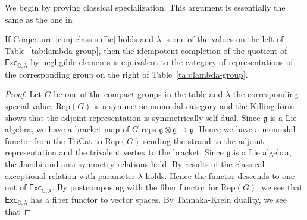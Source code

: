 \documentclass[12pt]{amsart}
\begin{document}
We begin by proving classical specialization.  This argument is essentially the same as the one in 

\begin{proposition}
If Conjecture \ref{conj:class-suffic} holds and $\lambda$ is one of
the values on the left of Table~\ref{tab:lambda-group}, then the
idempotent completion of the quotient of
$\mathsf{Exc}_{\mathbb{C},\lambda}$ by negligible elements is equivalent
to the category of representations of the corresponding group on the
right of Table~\ref{tab:lambda-group}.
\end{proposition}
\begin{proof}
Let $G$ be one of the compact groups in the table and $\lambda$ the corresponding special value.
$\mathrm{Rep}(G)$ is a symmetric monoidal category and the Killing form shows that the adjoint representation is symmetrically self-dual.   
Since $\mathfrak{g}$ is a Lie algebra, we have a bracket map of $G$-reps $\mathfrak{g} \otimes \mathfrak{g} \rightarrow \mathfrak{g}$.  Hence we have a monoidal functor from the TriCat  to $\mathrm{Rep}(G)$ sending the strand to the adjoint representation and the trivalent vertex to the bracket. Since $\mathfrak{g}$ is a Lie algebra, the Jacobi and anti-symmetry relations hold.  By results of  the classical exceptional relation with parameter $\lambda$ holds.  Hence the functor descends to one out of $\mathsf{Exc}_{\mathbb{C},\lambda}$.  %
By postcomposing with the fiber functor for $\mathrm{Rep}(G)$, we see that $\mathsf{Exc}_{\mathbb{C},\lambda}$ has a fiber functor to vector spaces.  By Tannaka-Krein duality, we see that 
\end{proof}








 
\end{document}
